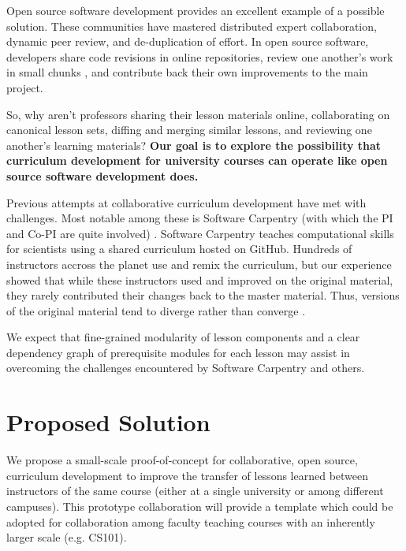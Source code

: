 \documentclass[11pt]{article}
\begin{document}
          Open source software development provides an excellent 
          example of a possible solution.
          These communities have mastered distributed expert collaboration, 
          dynamic peer review, and de-duplication of effort. In open source 
          software, developers share code revisions in online repositories, 
          review one another's work in small chunks \cite{wilson_best_2014}, 
          and contribute back their own improvements to the main project.

          So, why aren't professors sharing their lesson materials online, 
          collaborating on canonical lesson sets, diffing and merging similar 
          lessons, and reviewing one another's learning materials? \textbf{Our 
          goal is to explore the possibility that curriculum development for 
          university courses can operate like open source software development 
          does.}
           
          Previous attempts at collaborative curriculum development have met with 
          challenges. Most notable among these is Software Carpentry (with 
          which the PI and Co-PI are quite involved) 
          \cite{wilson_software_2014}.  Software Carpentry teaches 
          computational skills for scientists using a shared curriculum hosted 
          on GitHub. Hundreds of instructors accross the planet use and remix 
          the curriculum, but our experience showed that while these 
          instructors used and improved on the original material, they rarely 
          contributed their changes back to the master material. Thus, versions 
          of the original material tend to diverge rather than converge 
          \cite{wilson_software_2014,wilson_software_2014-1}. 
          
          We expect that 
          fine-grained modularity of lesson components and a clear dependency 
          graph of prerequisite modules for each lesson may assist in 
          overcoming the challenges encountered by Software Carpentry and 
          others.

          \section{Proposed Solution}
          We propose a small-scale proof-of-concept for collaborative, open 
          source, curriculum development to improve the transfer of lessons 
          learned between instructors of the same course (either at a single 
          university or among different campuses). This prototype collaboration 
          will provide a template which could be adopted for collaboration 
          among faculty teaching courses with an inherently larger scale (e.g. 
          CS101).
\end{document}
